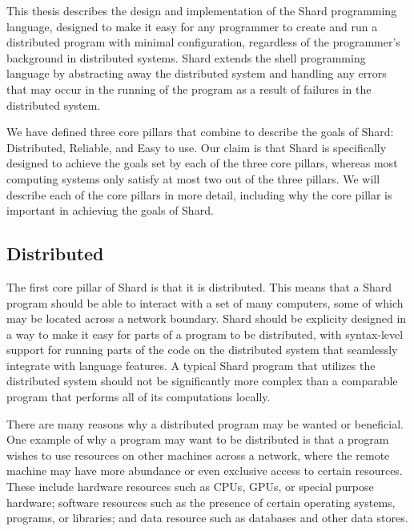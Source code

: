 \documentclass[twoside]{report}
\begin{document}
This thesis describes the design and implementation of the Shard programming language, designed to make it easy for any programmer to create and run a distributed program with minimal configuration, regardless of the programmer's background in distributed systems. Shard extends the shell programming language by abstracting away the distributed system and handling any errors that may occur in the running of the program as a result of failures in the distributed system.

We have defined three core pillars that combine to describe the goals of Shard: Distributed, Reliable, and Easy to use. Our claim is that Shard is specifically designed to achieve the goals set by each of the three core pillars, whereas most computing systems only satisfy at most two out of the three pillars.
We will describe each of the core pillars in more detail, including why the core pillar is important in achieving the goals of Shard.

\subsection{Distributed}

The first core pillar of Shard is that it is distributed.
This means that a Shard program should be able to interact with a set of many computers, some of which may be located across a network boundary.
Shard should be explicity designed in a way to make it easy for parts of a program to be distributed, with syntax-level support for running parts of the code on the distributed system that seamlessly integrate with language features.
A typical Shard program that utilizes the distributed system should not be significantly more complex than a comparable program that performs all of its computations locally.

There are many reasons why a distributed program may be wanted or beneficial.
One example of why a program may want to be distributed is that a program wishes to use resources on other machines across a network, where the remote machine may have more abundance or even exclusive access to certain resources.
These include hardware resources such as CPUs, GPUs, or special purpose hardware; software resources such as the presence of certain operating systems, programs, or libraries; and data resource such as databases and other data stores.
\end{document}
